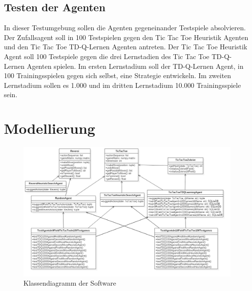 \subsection{Testen der Agenten}
In dieser Testumgebung sollen die Agenten gegeneinander Testspiele absolvieren. Der Zufallsagent soll in 100 Testspielen gegen den Tic Tac Toe Heuristik Agenten und den Tic Tac Toe TD-Q-Lernen Agenten antreten. Der Tic Tac Toe Heuristik Agent soll 100 Testspiele gegen die drei Lernstadien des Tic Tac Toe TD-Q-Lernen Agenten spielen. Im ersten Lernstadium soll der TD-Q-Lernen Agent, in 100 Trainingsspielen gegen sich selbst, eine Strategie entwickeln. Im zweiten Lernstadium sollen es 1.000 und im dritten Lernstadium 10.000 Trainingsspiele sein.

\section{Modellierung}

\begin{figure}[!htbp]
  \centering
  \includegraphics[angle = 90, scale = 0.5]{inhalt/abbildungen/projectClassDiagram.jpg}
  \caption{Klassendiagramm der Software}
  \label{fig:klassendiagramm}
\end{figure} 
